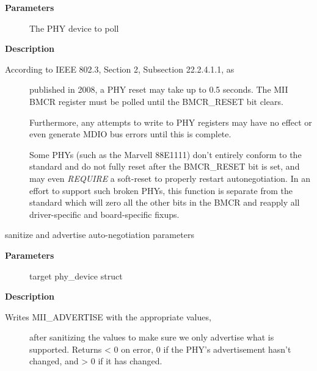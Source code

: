 \documentclass[a4paper,8pt,english]{sphinxmanual}
\begin{document}
\textbf{Parameters}
\begin{description}
\item[{}] \leavevmode
The PHY device to poll

\end{description}

\textbf{Description}
\begin{description}
\item[{According to IEEE 802.3, Section 2, Subsection 22.2.4.1.1, as}] \leavevmode
published in 2008, a PHY reset may take up to 0.5 seconds.  The MII BMCR
register must be polled until the BMCR\_RESET bit clears.

Furthermore, any attempts to write to PHY registers may have no effect
or even generate MDIO bus errors until this is complete.

Some PHYs (such as the Marvell 88E1111) don't entirely conform to the
standard and do not fully reset after the BMCR\_RESET bit is set, and may
even \emph{REQUIRE} a soft-reset to properly restart autonegotiation.  In an
effort to support such broken PHYs, this function is separate from the
standard  which will zero all the other bits in the BMCR
and reapply all driver-specific and board-specific fixups.

\end{description}

\begin{fulllineitems}
\label{networking/kapi:c.genphy_config_advert}
sanitize and advertise auto-negotiation parameters

\end{fulllineitems}


\textbf{Parameters}
\begin{description}
\item[{}] \leavevmode
target phy\_device struct

\end{description}

\textbf{Description}
\begin{description}
\item[{Writes MII\_ADVERTISE with the appropriate values,}] \leavevmode
after sanitizing the values to make sure we only advertise
what is supported.  Returns \textless{} 0 on error, 0 if the PHY's advertisement
hasn't changed, and \textgreater{} 0 if it has changed.

\end{description}
\end{document}
